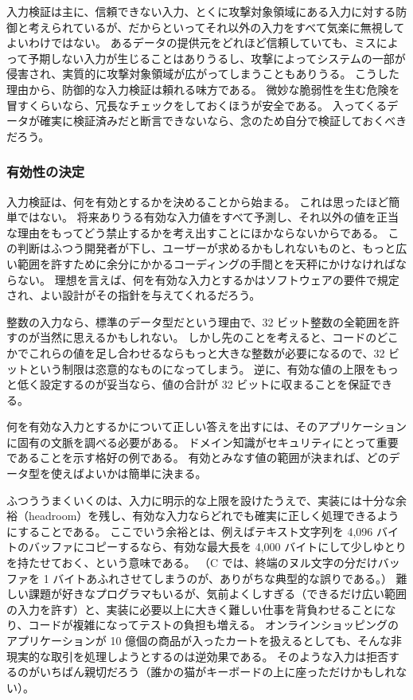 \documentclass[uplatex]{jsarticle}
\def\label#1{}%
\begin{document}
入力検証は主に、信頼できない入力、とくに攻撃対象領域にある入力に対する防御と考えられているが、だからといってそれ以外の入力をすべて気楽に無視してよいわけではない。
あるデータの提供元をどれほど信頼していても、ミスによって予期しない入力が生じることはありうるし、攻撃によってシステムの一部が侵害され、実質的に攻撃対象領域が広がってしまうこともありうる。
こうした理由から、防御的な入力検証は頼れる味方である。
微妙な脆弱性を生む危険を冒すくらいなら、冗長なチェックをしておくほうが安全である。
入ってくるデータが確実に検証済みだと断言できないなら、念のため自分で検証しておくべきだろう。

\subsubsection{有効性の決定}

入力検証は、何を有効とするかを決めることから始まる。
これは思ったほど簡単ではない。
将来ありうる有効な入力値をすべて予測し、それ以外の値を正当な理由をもってどう禁止するかを考え出すことにほかならないからである。
この判断はふつう開発者が下し、ユーザーが求めるかもしれないものと、もっと広い範囲を許すために余分にかかるコーディングの手間とを天秤にかけなければならない。
理想を言えば、何を有効な入力とするかはソフトウェアの要件で規定され、よい設計がその指針を与えてくれるだろう。

\begin{exa}[整数入力の範囲]\label{exa:ch10-integer-range}
整数の入力なら、標準のデータ型だという理由で、32 ビット整数の全範囲を許すのが当然に思えるかもしれない。
しかし先のことを考えると、コードのどこかでこれらの値を足し合わせるならもっと大きな整数が必要になるので、32 ビットという制限は恣意的なものになってしまう。
逆に、有効な値の上限をもっと低く設定するのが妥当なら、値の合計が 32 ビットに収まることを保証できる。
\end{exa}

何を有効な入力とするかについて正しい答えを出すには、そのアプリケーションに固有の文脈を調べる必要がある。
ドメイン知識がセキュリティにとって重要であることを示す格好の例である。
有効とみなす値の範囲が決まれば、どのデータ型を使えばよいかは簡単に決まる。

ふつううまくいくのは、入力に明示的な上限を設けたうえで、実装には十分な余裕（headroom）を残し、有効な入力ならどれでも確実に正しく処理できるようにすることである。
ここでいう余裕とは、例えばテキスト文字列を 4,096 バイトのバッファにコピーするなら、有効な最大長を 4,000 バイトにして少しゆとりを持たせておく、という意味である。
（C では、終端のヌル文字の分だけバッファを 1 バイトあふれさせてしまうのが、ありがちな典型的な誤りである。）
難しい課題が好きなプログラマもいるが、気前よくしすぎる（できるだけ広い範囲の入力を許す）と、実装に必要以上に大きく難しい仕事を背負わせることになり、コードが複雑になってテストの負担も増える。
オンラインショッピングのアプリケーションが 10 億個の商品が入ったカートを扱えるとしても、そんな非現実的な取引を処理しようとするのは逆効果である。
そのような入力は拒否するのがいちばん親切だろう（誰かの猫がキーボードの上に座っただけかもしれない）。
\end{document}
